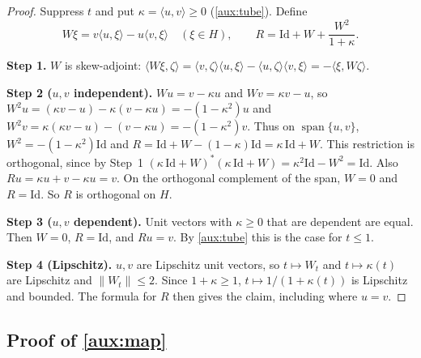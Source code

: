 \documentclass[11pt]{article}
\newcommand{\norm}[1]{\lVert #1\rVert}
\newcommand{\ip}[2]{\langle #1,#2\rangle}
\theoremstyle{definition}
\numberwithin{equation}{section}
\newcommand{\step}[1]{\par\smallskip\noindent\textbf{Step #1.}\enspace}
\begin{document}
\begin{proof}
Suppress \(t\) and put \(\kappa=\ip{u}{v}\ge0\) (\cref{aux:tube}). Define
\[
 W\xi=v\ip{u}{\xi}-u\ip{v}{\xi}\quad(\xi\in H),
 \qquad R=\mathrm{Id}+W+\frac{W^2}{1+\kappa}.
\]
\step{1}
\(W\) is skew-adjoint:
\(\ip{W\xi}{\zeta}=\ip v\zeta\ip u\xi-\ip u\zeta\ip v\xi
=-\ip{\xi}{W\zeta}\).

\step{2 (\(u,v\) independent)}
\(Wu=v-\kappa u\) and \(Wv=\kappa v-u\), so
\(W^2u=(\kappa v-u)-\kappa(v-\kappa u)=-(1-\kappa^2)u\) and
\(W^2v=\kappa(\kappa v-u)-(v-\kappa u)=-(1-\kappa^2)v\). Thus on
\(\operatorname{span}\{u,v\}\), \(W^2=-(1-\kappa^2)\mathrm{Id}\) and
\(R=\mathrm{Id}+W-(1-\kappa)\mathrm{Id}=\kappa\,\mathrm{Id}+W\).
This restriction is orthogonal, since by Step~1
\((\kappa\,\mathrm{Id}+W)^*(\kappa\,\mathrm{Id}+W)
=\kappa^2\mathrm{Id}-W^2=\mathrm{Id}\). Also
\(Ru=\kappa u+v-\kappa u=v\). On the orthogonal complement of the span,
\(W=0\) and \(R=\mathrm{Id}\). So \(R\) is orthogonal on \(H\).

\step{3 (\(u,v\) dependent)}
Unit vectors with \(\kappa\ge0\) that are dependent are equal. Then
\(W=0\), \(R=\mathrm{Id}\), and \(Ru=v\). By \cref{aux:tube} this is the
case for \(t\le1\).

\step{4 (Lipschitz)}
\(u,v\) are Lipschitz unit vectors, so \(t\mapsto W_t\) and
\(t\mapsto\kappa(t)\) are Lipschitz and \(\norm{W_t}\le2\). Since
\(1+\kappa\ge1\), \(t\mapsto1/(1+\kappa(t))\) is Lipschitz and bounded.
The formula for \(R\) then gives the claim, including where \(u=v\).
\end{proof}

\subsection{Proof of \cref{aux:map}}
\end{document}
